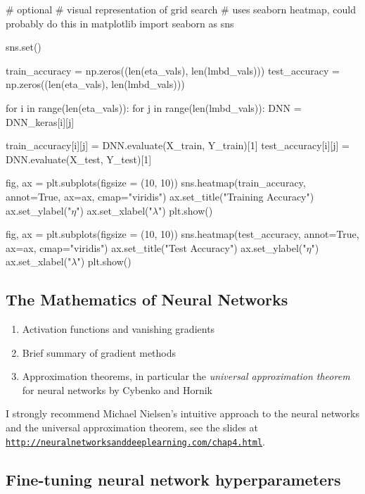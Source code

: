 \documentclass[%
oneside,                 %
final,                   %
10pt]{article}
\begin{document}
\bpycod
# optional
# visual representation of grid search
# uses seaborn heatmap, could probably do this in matplotlib
import seaborn as sns

sns.set()

train_accuracy = np.zeros((len(eta_vals), len(lmbd_vals)))
test_accuracy = np.zeros((len(eta_vals), len(lmbd_vals)))

for i in range(len(eta_vals)):
    for j in range(len(lmbd_vals)):
        DNN = DNN_keras[i][j]

        train_accuracy[i][j] = DNN.evaluate(X_train, Y_train)[1]
        test_accuracy[i][j] = DNN.evaluate(X_test, Y_test)[1]

        
fig, ax = plt.subplots(figsize = (10, 10))
sns.heatmap(train_accuracy, annot=True, ax=ax, cmap="viridis")
ax.set_title("Training Accuracy")
ax.set_ylabel("$\eta$")
ax.set_xlabel("$\lambda$")
plt.show()

fig, ax = plt.subplots(figsize = (10, 10))
sns.heatmap(test_accuracy, annot=True, ax=ax, cmap="viridis")
ax.set_title("Test Accuracy")
ax.set_ylabel("$\eta$")
ax.set_xlabel("$\lambda$")
plt.show()

\epycod


\subsection{The Mathematics of Neural Networks}

\begin{enumerate}
\item Activation functions and vanishing gradients

\item Brief summary of gradient methods

\item Approximation theorems, in particular the \emph{universal approximation theorem} for neural networks by Cybenko and Hornik
\end{enumerate}

\noindent
I strongly recommend Michael Nielsen's intuitive approach to the neural networks and the universal approximation theorem, see the slides at \href{{http://neuralnetworksanddeeplearning.com/chap4.html}}{\nolinkurl{http://neuralnetworksanddeeplearning.com/chap4.html}}.

\subsection{Fine-tuning neural network hyperparameters}
\end{document}

